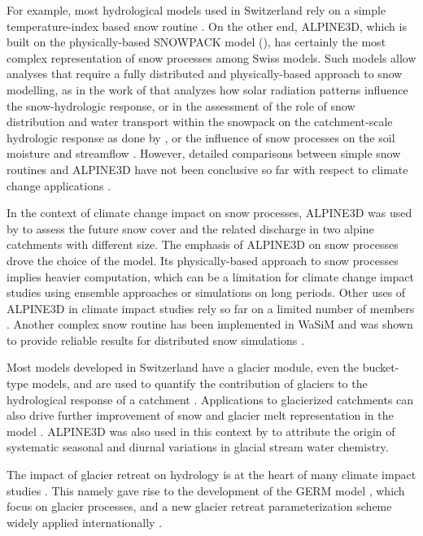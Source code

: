 \documentclass[10pt,a4paper]{article}
\begin{document}
For example, most hydrological models used in Switzerland rely on a simple temperature-index based snow routine \citep[see for example][]{Jenicek2018}. On the other end, ALPINE3D, which is built on the physically-based SNOWPACK model (\citealt{Bartelt2002, Lehning2002a, Lehning2002b}), has certainly the most complex representation of snow processes among Swiss models. Such models allow analyses that require a fully distributed and physically-based approach to snow modelling, as in the work of \citet{Comola2015a} that analyzes how solar radiation patterns influence the snow-hydrologic response, or in the assessment of the role of snow distribution and water transport within the snowpack on the catchment-scale hydrologic response as done by \citet{Brauchli2017}, or the influence of snow processes on the soil moisture and streamflow \citep{Wever2017}. However, detailed comparisons between simple snow routines and ALPINE3D have not been conclusive so far with respect to climate change applications \citep{Kobierska2011, Shakoor2018}.

In the context of climate change impact on snow processes, ALPINE3D was used by \citet{Bavay2009} to assess the future snow cover and the related discharge in two alpine catchments with different size. The emphasis of ALPINE3D on snow processes drove the choice of the model. Its physically-based approach to snow processes implies heavier computation, which can be a limitation for climate change impact studies using ensemble approaches or simulations on long periods. Other uses of ALPINE3D in climate impact studies rely so far on a limited number of members \citep[climate scenarios or climate model chains;][]{Bavay2013, Marty2017}. Another complex snow routine has been implemented in WaSiM and was shown to provide reliable results for distributed snow simulations \citep{Thornton2021}. 

Most models developed in Switzerland have a glacier module, even the bucket-type models, and are used to quantify the contribution of glaciers to the hydrological response of a catchment \citep[see for example][]{Verbunt2003, Zappa2007a, Uhlmann2013a}. Applications to glacierized catchments can also drive further improvement of snow and glacier melt representation in the model \citep{Finger2011}. ALPINE3D was also used in this context by \citet{Hindshaw2011} to attribute the origin of systematic seasonal and diurnal variations in glacial stream water chemistry.

The impact of glacier retreat on hydrology is at the heart of many climate impact studies \citep{Horton2006, Schaefli2007b, Junghans2011, Addor2014, Finger2015, Etter2017}. This namely gave rise to the development of the GERM model \citep{Huss2016, Junghans2011, Farinotti2012, Finger2013}, which focus on glacier processes, and a new glacier retreat parameterization scheme widely applied internationally \citep{Huss2010}.
\end{document}
